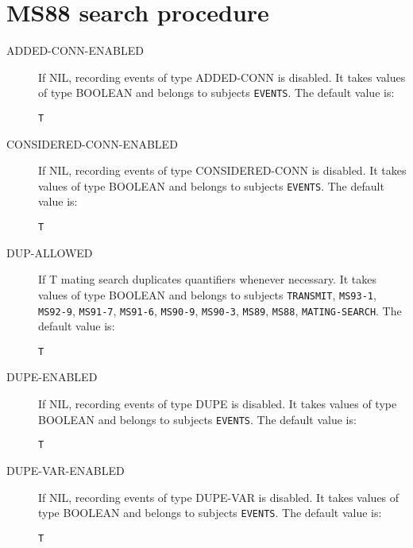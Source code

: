 \section{MS88 search procedure}

\begin{description} 
\item[ADDED-CONN-ENABLED]  
If NIL, recording events of type ADDED-CONN is disabled.
It takes values of type BOOLEAN and belongs to subjects \texttt{EVENTS}.  The default value is: \begin{lstlisting}
T
\end{lstlisting}

\item[CONSIDERED-CONN-ENABLED]  
If NIL, recording events of type CONSIDERED-CONN is disabled.
It takes values of type BOOLEAN and belongs to subjects \texttt{EVENTS}.  The default value is: \begin{lstlisting}
T
\end{lstlisting}

\item[DUP-ALLOWED]  
If T mating search duplicates quantifiers whenever necessary.
It takes values of type BOOLEAN and belongs to subjects \texttt{TRANSMIT}, \texttt{MS93-1}, \texttt{MS92-9}, \texttt{MS91-7}, \texttt{MS91-6}, \texttt{MS90-9}, \texttt{MS90-3}, \texttt{MS89}, \texttt{MS88}, \texttt{MATING-SEARCH}.  The default value is: \begin{lstlisting}
T
\end{lstlisting}

\item[DUPE-ENABLED]  
If NIL, recording events of type DUPE is disabled.
It takes values of type BOOLEAN and belongs to subjects \texttt{EVENTS}.  The default value is: \begin{lstlisting}
T
\end{lstlisting}

\item[DUPE-VAR-ENABLED]  
If NIL, recording events of type DUPE-VAR is disabled.
It takes values of type BOOLEAN and belongs to subjects \texttt{EVENTS}.  The default value is: \begin{lstlisting}
T
\end{lstlisting}


\end{description}
